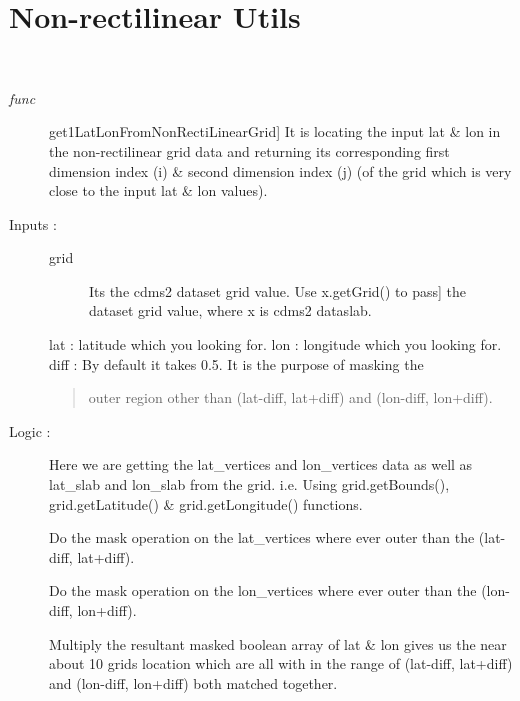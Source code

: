 \documentclass[letterpaper,10pt,english]{sphinxmanual}
\begin{document}
\section{Non-rectilinear Utils}
\label{others:module-nonrect_utils}\label{others:non-rectilinear-utils}

\begin{fulllineitems}
\label{others:nonrect_utils.get1LatLonFromNonRectiLinearGrid}~\begin{description}
\item[{\emph{func}}] \leavevmode{[}get1LatLonFromNonRectiLinearGrid{]}
It is locating the input lat \& lon in the non-rectilinear grid
data and returning its corresponding first dimension index (i) \&
second dimension index (j) (of the grid which is very close to
the input lat \& lon values).

\item[{Inputs :}] \leavevmode\begin{description}
\item[{grid}] \leavevmode{[}Its the cdms2 dataset grid value. Use x.getGrid() to pass{]}
the dataset grid value, where x is cdms2 dataslab.

\end{description}

lat : latitude which you looking for.
lon : longitude which you looking for.
diff : By default it takes 0.5. It is the purpose of masking the
\begin{quote}

outer region other than (lat-diff, lat+diff) and
(lon-diff, lon+diff).
\end{quote}

\item[{Logic :}] \leavevmode
Here we are getting the lat\_vertices and lon\_vertices data as well as
lat\_slab and lon\_slab from the grid.  i.e. Using grid.getBounds(),
grid.getLatitude() \& grid.getLongitude() functions.

Do the mask operation on the lat\_vertices where ever outer than the
(lat-diff, lat+diff).

Do the mask operation on the lon\_vertices where ever outer than the
(lon-diff, lon+diff).

Multiply the resultant masked boolean array of lat \& lon gives us the
near about 10 grids location which are all with in the range of
(lat-diff, lat+diff) and (lon-diff, lon+diff) both matched together.


\end{description}
\end{fulllineitems}
\end{document}
